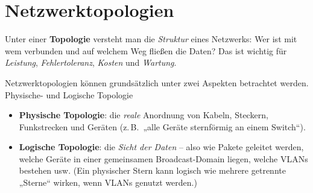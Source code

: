 \documentclass[../skript/main.tex]{subfiles}
\begin{document}
\section{Netzwerktopologien}
Unter einer \textbf{Topologie} versteht man die \emph{Struktur} eines Netzwerks: Wer ist mit wem verbunden und auf welchem Weg fließen die Daten? Das ist wichtig für \emph{Leistung}, \emph{Fehlertoleranz}, \emph{Kosten} und \emph{Wartung}.

Netzwerktopologien können grundsätzlich unter zwei Aspekten betrachtet werden. Physische- und Logische Topologie
\begin{itemize}
	\item \textbf{Physische Topologie}: die \emph{reale} Anordnung von Kabeln, Steckern, Funkstrecken und Geräten (z.\,B.\ „alle Geräte sternförmig an einem Switch“).
	\item \textbf{Logische Topologie}: die \emph{Sicht der Daten} – also wie Pakete geleitet werden, welche Geräte in einer gemeinsamen Broadcast-Domain liegen, welche VLANs bestehen usw. (Ein physischer Stern kann logisch wie mehrere getrennte „Sterne“ wirken, wenn VLANs genutzt werden.)
\end{itemize}
\end{document}
